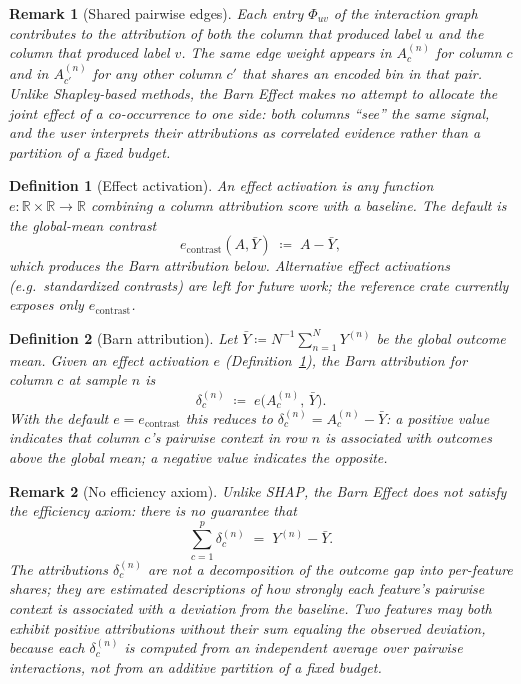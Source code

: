 \documentclass[11pt]{article}
\newtheorem{definition}{Definition}
\newtheorem{remark}{Remark}
\begin{document}
\begin{remark}[Shared pairwise edges]
\label{rem:shared-edges}
Each entry $\Phi_{uv}$ of the interaction graph contributes to the attribution of \emph{both} the column that produced label $u$ and the column that produced label $v$.
The same edge weight appears in $A_c^{(n)}$ for column $c$ and in $A_{c'}^{(n)}$ for any other column $c'$ that shares an encoded bin in that pair.
Unlike Shapley-based methods, the Barn Effect makes no attempt to allocate the joint effect of a co-occurrence to one side: both columns ``see'' the same signal, and the user interprets their attributions as correlated evidence rather than a partition of a fixed budget.
\end{remark}

\begin{definition}[Effect activation]
\label{def:effect-activation}
An \emph{effect activation} is any function $e : \mathbb{R} \times \mathbb{R} \to \mathbb{R}$ combining a column attribution score with a baseline.
The default is the \emph{global-mean contrast}
\[
  e_{\mathrm{contrast}}(A, \bar{Y}) \;\coloneqq\; A - \bar{Y},
\]
which produces the Barn attribution below.
Alternative effect activations (e.g.\ standardized contrasts) are left for future work; the reference crate currently exposes only $e_{\mathrm{contrast}}$.
\end{definition}

\begin{definition}[Barn attribution]
\label{def:delta}
Let $\bar{Y} \coloneqq N^{-1}\sum_{n=1}^{N} Y^{(n)}$ be the global outcome mean.
Given an effect activation $e$ (Definition~\ref{def:effect-activation}), the \emph{Barn attribution} for column $c$ at sample $n$ is
\begin{equation}
  \delta_c^{(n)} \;\coloneqq\; e\bigl(A_c^{(n)},\, \bar{Y}\bigr).
  \label{eq:delta}
\end{equation}
With the default $e = e_{\mathrm{contrast}}$ this reduces to $\delta_c^{(n)} = A_c^{(n)} - \bar{Y}$: a positive value indicates that column $c$'s pairwise context in row $n$ is associated with outcomes above the global mean; a negative value indicates the opposite.
\end{definition}

\begin{remark}[No efficiency axiom]
\label{rem:no-efficiency}
Unlike SHAP, the Barn Effect does not satisfy the \emph{efficiency axiom}: there is no guarantee that
\[
  \sum_{c=1}^{p} \delta_c^{(n)} \;=\; Y^{(n)} - \bar{Y}.
\]
The attributions $\delta_c^{(n)}$ are not a decomposition of the outcome gap into per-feature shares; they are \emph{estimated descriptions} of how strongly each feature's pairwise context is associated with a deviation from the baseline.
Two features may both exhibit positive attributions without their sum equaling the observed deviation, because each $\delta_c^{(n)}$ is computed from an independent average over pairwise interactions, not from an additive partition of a fixed budget.
\end{remark}
\end{document}
